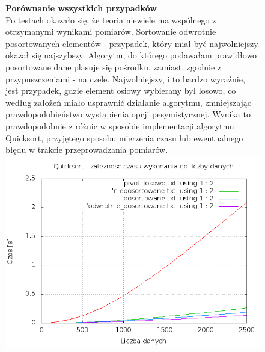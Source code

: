 \documentclass[a4paper,11pt]{report}
\begin{document}
\begin{figure}
  \begin{center}
  \textbf{Porównanie wszystkich przypadków}
  \\
Po testach okazało się, że teoria niewiele ma wspólnego z otrzymanymi wynikami pomiarów. Sortowanie odwrotnie posortowanych elementów - przypadek, który miał być najwolniejszy okazał się najszybszy. Algorytm, do którego podawałam prawidłowo posortowane dane plasuje się pośrodku, zamiast, zgodnie z przypuszczeniami - na czele. Najwolniejszy, i to bardzo wyraźnie, jest przypadek, gdzie element osiowy wybierany był losowo, co według założeń miało usprawnić działanie algorytmu, zmniejszając prawdopodobieństwo wystąpienia opcji pesymistycznej.
Wynika to prawdopodobnie z różnic w sposobie implementacji algorytmu Quicksort, przyjętego sposobu mierzenia czasu lub ewentualnego błędu w trakcie przeprowadzania pomiarów. 
\\
    \includegraphics[scale=0.5]{./quickRazem.png}
    \label{fig:}
  \end{center}
\end{figure}
\end{document}
